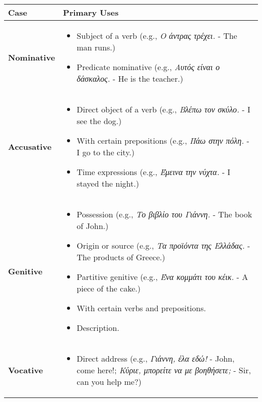 \documentclass{article}
\begin{document}
\begin{table}[h]
\centering
\begin{tabular}{lp{10cm}}
\toprule
\textbf{Case} & \textbf{Primary Uses} \\
\midrule
\textbf{Nominative} &
    \begin{itemize}
        \item Subject of a verb (e.g., \textit{Ο άντρας τρέχει.} - The man runs.)
        \item Predicate nominative (e.g., \textit{Αυτός είναι ο δάσκαλος.} - He is the teacher.)
    \end{itemize} \\
\midrule
\textbf{Accusative} &
    \begin{itemize}
        \item Direct object of a verb (e.g., \textit{Βλέπω τον σκύλο.} - I see the dog.)
        \item With certain prepositions (e.g., \textit{Πάω στην πόλη.} - I go to the city.)
        \item Time expressions (e.g., \textit{Έμεινα την νύχτα.} - I stayed the night.)
    \end{itemize} \\
\midrule
\textbf{Genitive} &
    \begin{itemize}
        \item Possession (e.g., \textit{Το βιβλίο του Γιάννη.} - The book of John.)
        \item Origin or source (e.g., \textit{Τα προϊόντα της Ελλάδας.} - The products of Greece.)
        \item Partitive genitive (e.g., \textit{Ένα κομμάτι του κέικ.} - A piece of the cake.)
        \item With certain verbs and prepositions.
        \item Description.
    \end{itemize} \\
\midrule
\textbf{Vocative} &
    \begin{itemize}
        \item Direct address (e.g., \textit{Γιάννη, έλα εδώ!} - John, come here!; \textit{Κύριε, μπορείτε να με βοηθήσετε;} - Sir, can you help me?)
    \end{itemize} \\
\bottomrule
\end{tabular}
\end{table}
\end{document}
